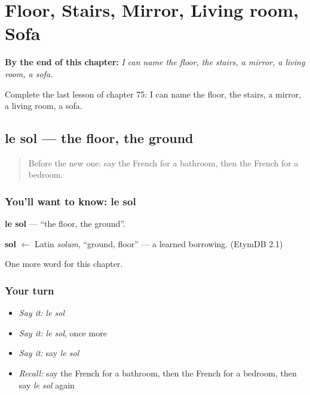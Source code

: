 
\chapter{Floor, Stairs, Mirror, Living room, Sofa}
\label{ch:fr-floor-stairs-mirror-living-room-sofa}

\begin{chapteropening}
\textbf{By the end of this chapter:} \emph{I can name the floor, the stairs, a mirror, a living room, a sofa.}

Complete the last lesson of chapter 75: I can name the floor, the stairs, a mirror, a living room, a sofa.
\end{chapteropening}

\section[le sol]{le sol — the floor, the ground}

\label{lesson:FR-C75-sol}



\begin{quote}
Before the new one: say the French for a bathroom, then the French for a bedroom.
\end{quote}

\subsection*{You'll want to know: le sol}
\textbf{le sol} — \textquotedblleft{}the floor, the ground\textquotedblright{}.

\begin{cousinweb}
\textbf{sol} $\leftarrow$ Latin \emph{solum}, \textquotedblleft{}ground, floor\textquotedblright{} — a learned borrowing. (EtymDB 2.1)
\end{cousinweb}

\begin{grammarlens}[title={What you've built}]
One more word for this chapter.
\end{grammarlens}

\subsection*{Your turn}
\begin{itemize}
\raggedright
  \item \emph{Say it:} \emph{le sol}
  \item \emph{Say it:} \emph{le sol}, once more
  \item \emph{Say it:} say \emph{le sol}
  \item \emph{Recall:} say the French for a bathroom, then the French for a bedroom, then say \emph{le sol} again
\end{itemize}


